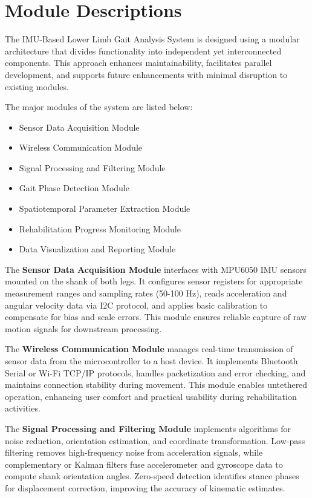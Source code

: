 \documentclass[12pt,a4paper]{report}
\begin{document}
\section{Module Descriptions}

The IMU-Based Lower Limb Gait Analysis System is designed using a modular architecture that divides functionality into independent yet interconnected components. This approach enhances maintainability, facilitates parallel development, and supports future enhancements with minimal disruption to existing modules.

The major modules of the system are listed below:

\begin{itemize}
    \item Sensor Data Acquisition Module
    \item Wireless Communication Module
    \item Signal Processing and Filtering Module
    \item Gait Phase Detection Module
    \item Spatiotemporal Parameter Extraction Module
    \item Rehabilitation Progress Monitoring Module
    \item Data Visualization and Reporting Module
\end{itemize}
The \textbf{Sensor Data Acquisition Module} interfaces with MPU6050 IMU sensors mounted on the shank of both legs. It configures sensor registers for appropriate measurement ranges and sampling rates (50-100 Hz), reads acceleration and angular velocity data via I2C protocol, and applies basic calibration to compensate for bias and scale errors. This module ensures reliable capture of raw motion signals for downstream processing.

The \textbf{Wireless Communication Module} manages real-time transmission of sensor data from the microcontroller to a host device. It implements Bluetooth Serial or Wi-Fi TCP/IP protocols, handles packetization and error checking, and maintains connection stability during movement. This module enables untethered operation, enhancing user comfort and practical usability during rehabilitation activities.

The \textbf{Signal Processing and Filtering Module} implements algorithms for noise reduction, orientation estimation, and coordinate transformation. Low-pass filtering removes high-frequency noise from acceleration signals, while complementary or Kalman filters fuse accelerometer and gyroscope data to compute shank orientation angles. Zero-speed detection identifies stance phases for displacement correction, improving the accuracy of kinematic estimates.
\end{document}
